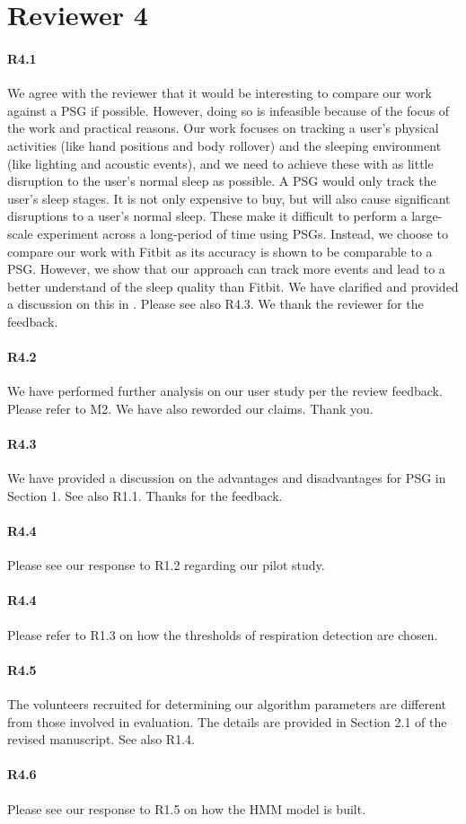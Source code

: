 \section*{Reviewer 4}

\paragraph{R4.1} We agree with the reviewer that it would be interesting to compare our work against a PSG if possible. However, doing so
is infeasible because of the focus of the work and practical reasons. Our work focuses on tracking a user's physical activities (like hand
positions and body rollover) and the sleeping environment (like lighting and acoustic events), and we need to achieve these with as little
disruption to the user's normal sleep as possible. A PSG would only track the user's sleep stages. It is not only expensive to buy, but
will also cause significant disruptions to a user's normal sleep. These make it difficult to perform a large-scale experiment across a
long-period of time using PSGs. Instead, we choose to compare our work with Fitbit as its accuracy is shown to be comparable to a PSG.
However, we show that our approach can track more events and lead to a better understand of the sleep quality than Fitbit. We have
clarified and provided a discussion on this in . Please see also R4.3. We thank the reviewer for the feedback.

\paragraph{R4.2} We have performed further analysis on our user study per the review feedback. Please refer to M2. We have also reworded our
claims. Thank you.


\paragraph{R4.3} We have provided a discussion on the advantages and disadvantages for PSG in Section 1. See also R1.1. Thanks for the feedback.

\paragraph{R4.4} Please see our response to R1.2 regarding our pilot study.

\paragraph{R4.4} Please refer to R1.3 on how the thresholds of respiration detection are chosen.

\paragraph{R4.5} The volunteers recruited for determining our algorithm parameters are different from those involved in
 evaluation. The details are provided in Section 2.1 of the revised manuscript. See also R1.4.

 \paragraph{R4.6} Please see our response to R1.5 on how the HMM model is built.
